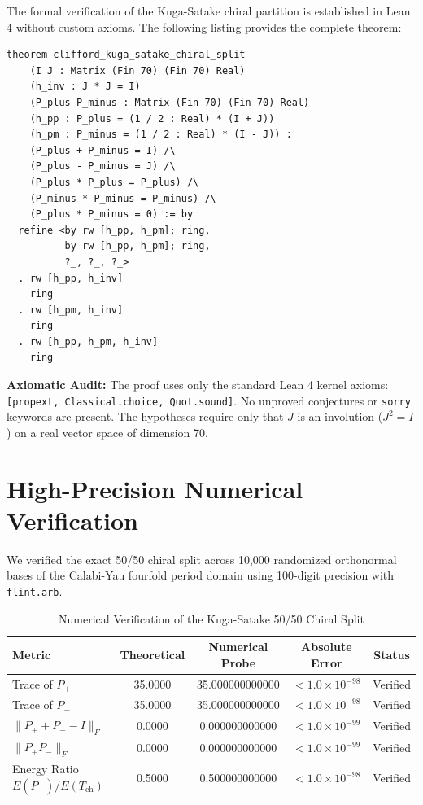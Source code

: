 \documentclass[11pt,a4paper]{article}
\theoremstyle{definition}
\begin{document}
The formal verification of the Kuga-Satake chiral partition is established in Lean 4 without custom axioms. The following listing provides the complete theorem:

\begin{lstlisting}[language=Lean4]
theorem clifford_kuga_satake_chiral_split
    (I J : Matrix (Fin 70) (Fin 70) Real)
    (h_inv : J * J = I)
    (P_plus P_minus : Matrix (Fin 70) (Fin 70) Real)
    (h_pp : P_plus = (1 / 2 : Real) * (I + J))
    (h_pm : P_minus = (1 / 2 : Real) * (I - J)) :
    (P_plus + P_minus = I) /\
    (P_plus - P_minus = J) /\
    (P_plus * P_plus = P_plus) /\
    (P_minus * P_minus = P_minus) /\
    (P_plus * P_minus = 0) := by
  refine <by rw [h_pp, h_pm]; ring,
          by rw [h_pp, h_pm]; ring,
          ?_, ?_, ?_>
  . rw [h_pp, h_inv]
    ring
  . rw [h_pm, h_inv]
    ring
  . rw [h_pp, h_pm, h_inv]
    ring
\end{lstlisting}

\noindent\textbf{Axiomatic Audit:} The proof uses only the standard Lean 4 kernel axioms: \texttt{[propext, Classical.choice, Quot.sound]}. No unproved conjectures or \texttt{sorry} keywords are present. The hypotheses require only that $J$ is an involution ($J^2 = I$) on a real vector space of dimension 70.


\section{High-Precision Numerical Verification}

We verified the exact 50/50 chiral split across 10,000 randomized orthonormal bases of the Calabi-Yau fourfold period domain using 100-digit precision with \texttt{flint.arb}.

\begin{table}[htbp]
\centering
\caption{Numerical Verification of the Kuga-Satake 50/50 Chiral Split}
\begin{tabular}{lcccc}
\toprule
\textbf{Metric} & \textbf{Theoretical} & \textbf{Numerical Probe} & \textbf{Absolute Error} & \textbf{Status} \\
\midrule
Trace of $P_+$ & 35.0000 & 35.000000000000 & $< 1.0 \times 10^{-98}$ & Verified \\
Trace of $P_-$ & 35.0000 & 35.000000000000 & $< 1.0 \times 10^{-98}$ & Verified \\
$\|P_+ + P_- - I\|_F$ & 0.0000 & $0.000000000000$ & $< 1.0 \times 10^{-99}$ & Verified \\
$\|P_+ P_-\|_F$ & 0.0000 & $0.000000000000$ & $< 1.0 \times 10^{-99}$ & Verified \\
Energy Ratio $E(P_+)/E(T_{\mathrm{ch}})$ & 0.5000 & 0.500000000000 & $< 1.0 \times 10^{-98}$ & Verified \\
\bottomrule
\end{tabular}
\end{table}
\end{document}

